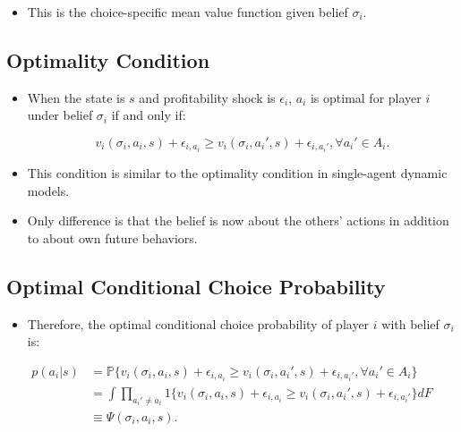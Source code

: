 \documentclass[]{book}
\providecommand{\tightlist}{%
  \setlength{\itemsep}{0pt}\setlength{\parskip}{0pt}}
\begin{document}
\begin{itemize}
\tightlist
\item
  This is the choice-specific mean value function given belief
  \(\sigma_i\).
\end{itemize}

\subsection{Optimality Condition}\label{optimality-condition-2}

\begin{itemize}
\tightlist
\item
  When the state is \(s\) and profitability shock is \(\epsilon_i\),
  \(a_i\) is optimal for player \(i\) under belief \(\sigma_i\) if and
  only if:

  \begin{equation}
  v_i(\sigma_i, a_i, s) + \epsilon_{i, a_i} \ge  v_i(\sigma_i, a_i', s) + \epsilon_{i, a_i'}, \forall a_i' \in A_i.
  \end{equation}
\item
  This condition is similar to the optimality condition in single-agent
  dynamic models.
\item
  Only difference is that the belief is now about the others' actions in
  addition to about own future behaviors.
\end{itemize}

\subsection{Optimal Conditional Choice
Probability}\label{optimal-conditional-choice-probability-1}

\begin{itemize}
\tightlist
\item
  Therefore, the optimal conditional choice probability of player \(i\)
  with belief \(\sigma_i\) is:
\end{itemize}

\begin{equation}
\begin{split}
p(a_i|s) &= \mathbb{P}\{v_i(\sigma_i, a_i, s) + \epsilon_{i, a_i} \ge  v_i(\sigma_i, a_i', s) + \epsilon_{i, a_i'}, \forall a_i' \in A_i\}\\
&=\int \prod_{a_i' \neq a_i}1\{v_i(\sigma_i, a_i, s) + \epsilon_{i, a_i} \ge  v_i(\sigma_i, a_i', s) + \epsilon_{i, a_i'}\} d F\\
&\equiv \Psi(\sigma_i, a_i, s).
\end{split}
\end{equation}
\end{document}
